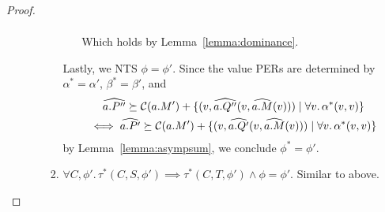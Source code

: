 \begin{proof}
\begin{enumerate}
\begin{itemize}
\begin{enumerate}
\begin{itemize}
\begin{gather*}
          \end{gather*}
          Which holds by Lemma~\ref{lemma:dominance}.
      \end{itemize}
      Lastly, we NTS $\phi = \phi'$. Since the value PERs are determined by $\alpha^* = \alpha'$, $\beta^* = \beta'$, 
      and 
          \begin{gather*}
            \widehat{a.P''} \succeq \mathcal{C}(a.M') + \{(v, \widehat{a.Q''}(v,\widehat{a.M}(v))) \mid \forall v.\, \alpha^*(v,v)\}\\
          \iff \widehat{a.P'} \succeq \mathcal{C}(a.M') + \{(v, \widehat{a.Q'}(v,\widehat{a.M}(v))) \mid \forall v.\, \alpha^*(v,v)\} 
          \end{gather*}
          by Lemma~\ref{lemma:asympsum},
      we conclude $\phi^* = \phi'$.
  \item $\forall C,\phi'.\, \tau^*(C,S,\phi') \implies \tau^*(C,T,\phi') \land \phi = \phi'$. Similar to above.
  \end{enumerate}

\end{itemize}
\end{enumerate}
\end{proof}
